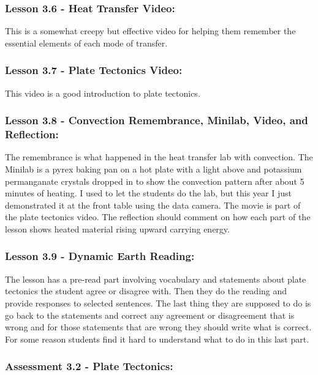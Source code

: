 \documentclass[11pt]{article}
\begin{document}
\subsubsection{Lesson 3.6 - Heat Transfer Video:}
\label{sec:org9931426}

This is a somewhat creepy but effective video for
helping them remember the essential elements of each mode of transfer.


\subsubsection{Lesson 3.7 - Plate Tectonics Video:}
\label{sec:org81fb999}

This video is a good introduction to plate tectonics.


\subsubsection{Lesson 3.8 - Convection Remembrance, Minilab, Video, and Reflection:}
\label{sec:org1cc691d}

The remembrance is what happened in the heat transfer lab with convection. The Minilab is a
pyrex baking pan on a hot plate with a light above and potassium permanganate crystals
dropped in to show the convection pattern after about 5 minutes of heating. I used to let
the students do the lab, but this year I just demonstrated it at the front table using the
data camera. The movie is part of the plate tectonics video. The reflection should
comment on how each part of the lesson shows heated material rising upward carrying
energy.


\subsubsection{Lesson 3.9 - Dynamic Earth Reading:}
\label{sec:org811db04}

The lesson has a pre-read part involving vocabulary and statements about plate tectonics the student agree or disagree with.
Then they do the reading and provide responses to selected sentences. The last thing
they are supposed to do is go back to the statements and correct any agreement or
disagreement that is wrong and for those statements that are wrong they should write
what is correct. For some reason students find it hard to understand what to do in this
last part.


\subsubsection{Assessment 3.2 - Plate Tectonics:}
\label{sec:org14d7dd9}
\end{document}
